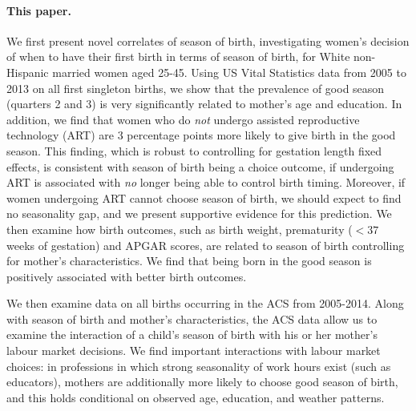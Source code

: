 \documentclass[a4paper, 11.5 pt]{article}
\theoremstyle{plain}
\begin{document}
\begin{doublespace}
\paragraph{This paper.} We first present novel correlates of season of birth, investigating women's decision of when to have their first birth in terms of season of birth, for White non-Hispanic married women aged 25-45. Using US Vital Statistics data from 2005 to 2013 on all first singleton births, we show that the prevalence of good season (quarters 2 and 3) is very significantly related to mother's age and education. In addition, we find that women who do \emph{not} undergo assisted reproductive technology (ART) are 3 percentage points more likely to give birth in the good season. This finding, which is robust to controlling for gestation length fixed effects, is consistent with season of birth being a choice outcome, if undergoing ART is associated with \emph{no} longer being able to control birth timing. Moreover, if women undergoing ART cannot choose season of birth, we should expect to find no seasonality gap, and we present supportive evidence for this prediction. We then examine how birth outcomes, such as birth weight, prematurity ($<37$ weeks of gestation) and APGAR scores, are related to season of birth controlling for mother's characteristics. We find that being born in the good season is positively associated with better birth outcomes.

We then examine data on all births occurring in the ACS from 2005-2014.  Along with season of birth and mother's characteristics, the ACS data allow us to examine the interaction of a child's season of birth with his or her mother's labour market decisions.  We find important interactions with labour market choices: in professions in which strong seasonality of work hours exist (such as educators), mothers are additionally more likely to choose good season of birth, and this holds conditional on observed age, education, and weather patterns.



\end{doublespace}
\end{document}
